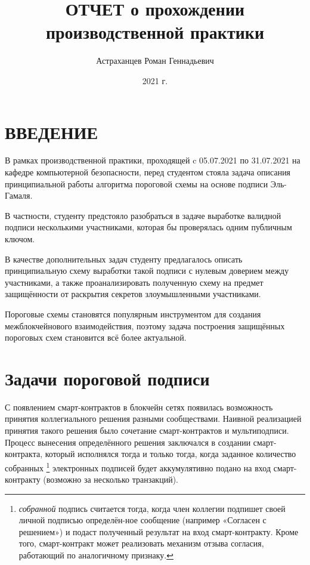 \documentclass[a4paper,12pt]{article}
\author{Астраханцев Роман Геннадьевич}
\title{ОТЧЕТ о прохождении производственной практики}
\date{2021 г.}
\theoremstyle{definition}
\begin{document}
	
	\maketitle
	
	\newpage
	\tableofcontents
	
	\newpage
	\section*{ВВЕДЕНИЕ}
	
	В рамках производственной практики, проходящей c 05.07.2021 по 31.07.2021 на кафедре компьютерной безопасности, перед студентом стояла задача описания принципиальной работы алгоритма пороговой схемы на основе подписи Эль-Гамаля. 
	
	В частности, студенту предстояло разобраться в задаче выработке валидной подписи несколькими участниками, которая бы проверялась одним публичным ключом. 
	
	В качестве дополнительных задач студенту предлагалось описать принципиальную схему выработки такой подписи с нулевым доверием между участниками, а также проанализировать полученную схему на предмет защищённости от раскрытия секретов злоумышленными участниками. 
	
	Пороговые схемы становятся популярным инструментом для создания межблокчейнового взаимодействия, поэтому задача построения защищённых пороговых схем становится всё более актуальной.
	
	\newpage
	\section{Задачи пороговой подписи }	
	
	С появлением смарт-контрактов в блокчейн сетях появилась возможность принятия коллегиального решения разными сообществами. Наивной реализацией принятия такого решения было сочетание смарт-контрактов и мультиподписи. Процесс вынесения определённого решения заключался в создании смарт-контракта, который исполнялся тогда и только тогда, когда заданное количество собранных 
	\footnote{\emph{собранной} подпись считается тогда, когда член коллегии подпишет своей личной подписью определён-ное сообщение (например «Согласен с решением») и подаст полученный результат на вход смарт-контракту. Кроме того, смарт-контракт может реализовать механизм отзыва согласия, работающий по аналогичному признаку.}  
	электронных подписей будет аккумулятивно подано на вход смарт-контракту (возможно за несколько транзакций). 
	
\end{document}

